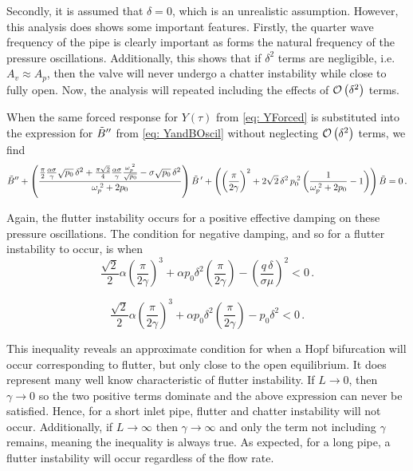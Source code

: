 
Secondly, it is assumed that $\delta = 0$, which is an unrealistic assumption. However, this analysis does shows some important features. Firstly, the quarter wave frequency of the pipe is clearly important as forms the natural frequency of the pressure oscillations. Additionally, this shows that if $\delta^2$ terms are negligible, i.e. $A_v \approx A_p$, then the valve will never undergo a chatter instability while close to fully open. Now, the analysis will repeated including the effects of $\mathcal{O}\left( \delta^2 \right)$ terms.

\newpage
When the same forced response for $Y(\tau)$ from \cref{eq: YForced} is substituted into the expression for $\tilde{B}{''}$ from \cref{eq: YandBOscil} without neglecting $\mathcal{O}\left( \delta^2 \right)$ terms, we find
~
\begin{equation*}
    \tilde{B}{''} +
    \left( \frac{
    \frac{\pi}{2} \frac{\alpha \sigma}{\gamma} \sqrt{p_0} \, \delta^2 + \frac{\pi \sqrt{2}}{4} \frac{\alpha \sigma}{\gamma} \frac{\omega_p^{\;2}}{\sqrt{p_0}} - \sigma \sqrt{p_0} \, \delta^2
    }{\omega_p^{\;2} + 2 p_0} \right) \tilde{B}\,{'} +
    \left( \left( \frac{\pi}{2 \gamma} \right)^2 + 2 \sqrt{2} \, \delta^2 \, p_0^{\;2} \left( \frac{1}{\omega_p^{\;2} + 2 p_0} - 1 \right) \right) \tilde{B} = 0 \, .
\end{equation*}

Again, the flutter instability occurs for a positive effective damping on these pressure oscillations. The condition for negative damping, and so for a flutter instability to occur, is when
~
\begin{equation} \label{eq: QWMStabilityInequality}
    \frac{\sqrt{2}}{2} \alpha \left( \frac{\pi}{2 \gamma} \right)^3 + \alpha p_0 \delta^2 \left( \frac{\pi}{2 \gamma} \right) - \left( \frac{q \, \delta}{\sigma \mu} \right)^2 < 0 \, .
\end{equation}

\begin{equation*} %
    \frac{\sqrt{2}}{2} \alpha \left( \frac{\pi}{2 \gamma} \right)^3 + \alpha p_0 \delta^2 \left( \frac{\pi}{2 \gamma} \right) - p_0 \delta^2 < 0 \, .
\end{equation*}

This inequality reveals an approximate condition for when a Hopf bifurcation will occur corresponding to flutter, but only close to the open equilibrium. It does represent many well know characteristic of flutter instability. If $L \rightarrow 0$, then $\gamma \rightarrow 0$ so the two positive terms dominate and the above expression can never be satisfied. Hence, for a short inlet pipe, flutter and chatter instability will not occur. Additionally, if $L \rightarrow \infty$ then $\gamma \rightarrow \infty$ and only the term not including $\gamma$ remains, meaning the inequality is always true. As expected, for a long pipe, a flutter instability will occur regardless of the flow rate.

